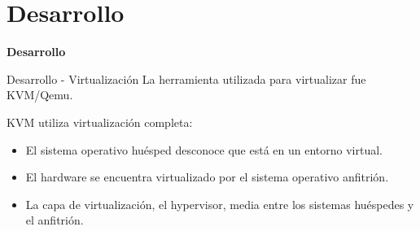 \section{Desarrollo}
\begin{frame}
    \Huge
    \centering
    \textbf{Desarrollo}

\end{frame}


\begin{frame}{Desarrollo - Virtualización}
    \vspace{-1.5cm}
    La herramienta utilizada para virtualizar fue KVM/Qemu.

    KVM utiliza virtualización completa:
    \begin{itemize}
        \item El sistema operativo huésped desconoce que está en un entorno virtual.
        \item El hardware se encuentra virtualizado por el sistema operativo anfitrión. 
        \item La capa de virtualización, el hypervisor, media entre los sistemas huéspedes y el anfitrión. 
    \end{itemize}

\end{frame}

